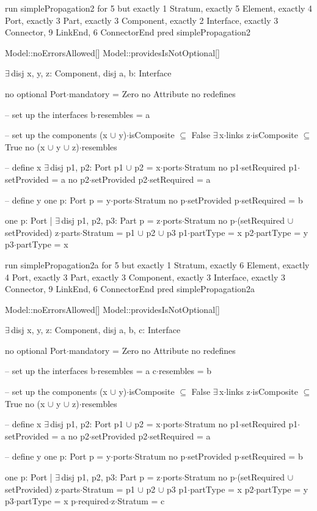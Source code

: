 run simplePropagation2 for 5 but exactly 1 Stratum, exactly 5 Element, exactly 4 Port, exactly 3 Part, exactly 3 Component, exactly 2 Interface, exactly 3 Connector, 9 LinkEnd, 6 ConnectorEnd
pred simplePropagation2
{
  Model::noErrorsAllowed[]
  Model::providesIsNotOptional[]

  $\exists\,$disj x, y, z: Component,
       disj a, b: Interface
  {
    no optional
    Port$\cdot$mandatory = Zero
    no Attribute
    no redefines
  
    -- set up the interfaces
    b$\cdot$resembles = a
  
    -- set up the components
    (x $\cup$ y)$\cdot$isComposite $\subseteq$ False
    $\exists\,$x$\cdot$links
    z$\cdot$isComposite $\subseteq$ True
    no (x $\cup$ y $\cup$ z)$\cdot$resembles
    
    -- define x
    $\exists\,$disj p1, p2: Port
    {
      p1 $\cup$ p2 = x$\cdot$ports$\cdot$Stratum
      no p1$\cdot$setRequired
      p1$\cdot$setProvided = a
      no p2$\cdot$setProvided
      p2$\cdot$setRequired = a
    }
    
    -- define y
    one p: Port
    {
      p = y$\cdot$ports$\cdot$Stratum
      no p$\cdot$setProvided
      p$\cdot$setRequired = b
    }
    
    one p: Port | $\exists\,$disj p1, p2, p3: Part
    {
      p = z$\cdot$ports$\cdot$Stratum
      no p$\cdot$(setRequired $\cup$ setProvided)
      z$\cdot$parts$\cdot$Stratum = p1 $\cup$ p2 $\cup$ p3
      p1$\cdot$partType = x
      p2$\cdot$partType = y
      p3$\cdot$partType = x
    }
  }
}

run simplePropagation2a for 5 but exactly 1 Stratum, exactly 6 Element, exactly 4 Port, exactly 3 Part, exactly 3 Component, exactly 3 Interface, exactly 3 Connector, 9 LinkEnd, 6 ConnectorEnd
pred simplePropagation2a
{
  Model::noErrorsAllowed[]
  Model::providesIsNotOptional[]

  $\exists\,$disj x, y, z: Component,
       disj a, b, c: Interface
  {
    no optional
    Port$\cdot$mandatory = Zero
    no Attribute
    no redefines
  
    -- set up the interfaces
    b$\cdot$resembles = a
    c$\cdot$resembles = b
  
    -- set up the components
    (x $\cup$ y)$\cdot$isComposite $\subseteq$ False
    $\exists\,$x$\cdot$links
    z$\cdot$isComposite $\subseteq$ True
    no (x $\cup$ y $\cup$ z)$\cdot$resembles
    
    -- define x
    $\exists\,$disj p1, p2: Port
    {
      p1 $\cup$ p2 = x$\cdot$ports$\cdot$Stratum
      no p1$\cdot$setRequired
      p1$\cdot$setProvided = a
      no p2$\cdot$setProvided
      p2$\cdot$setRequired = a
    }
    
    -- define y
    one p: Port
    {
      p = y$\cdot$ports$\cdot$Stratum
      no p$\cdot$setProvided
      p$\cdot$setRequired = b
    }
    
    one p: Port | $\exists\,$disj p1, p2, p3: Part
    {
      p = z$\cdot$ports$\cdot$Stratum
      no p$\cdot$(setRequired $\cup$ setProvided)
      z$\cdot$parts$\cdot$Stratum = p1 $\cup$ p2 $\cup$ p3
      p1$\cdot$partType = x
      p2$\cdot$partType = y
      p3$\cdot$partType = x
      p$\cdot$required$\cdot$z$\cdot$Stratum = c
    }
  }
}

